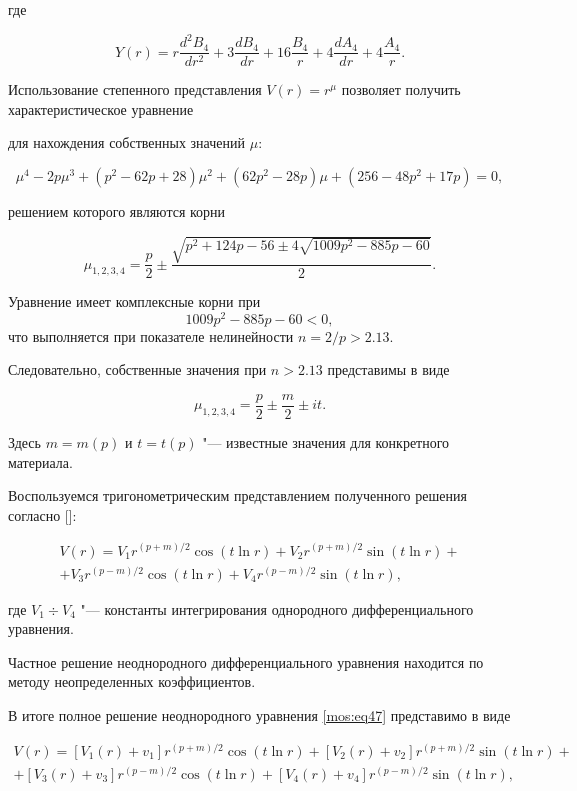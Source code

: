 где

\begin{equation*}

Y(r)=r\frac{d^2B_4}{dr^2}+3\frac{dB_4}{dr}+16\frac{B_4}{r}+4\frac{dA_4}{dr}+4\frac{A_4}{r}.

\end{equation*}



Использование степенного представления $V(r)=r^{\mu}$ позволяет получить характеристическое уравнение

для нахождения собственных значений $\mu$:

$$\mu^4-2p\mu^3+(p^2-62p+28)\mu^2+(62p^2-28p)\mu+(256-48p^2+17p)=0, $$

решением которого являются корни

$$\mu_{1,2,3,4}=\frac p2\pm\frac{\sqrt{p^2+124p-56\pm 4\sqrt{1009 p^2-885p-60}}}{2}.$$

Уравнение имеет комплексные корни при $$1009 p^2-885p-60<0,$$ что выполняется  при показателе нелинейности $n=2/p>2.13$. 

Следовательно, собственные значения  при $n>2.13$ представимы в виде

$$\mu_{1,2,3,4}=\frac p2\pm\frac m2\pm it .$$

Здесь $m=m(p)$  и  $t=t(p)$ "--- известные значения для конкретного материала.

Воспользуемся тригонометрическим представлением полученного решения согласно []:

\begin{multline}

\label{mos:eq48}

V(r)=V_{1} r^{(p+m)/2}\cos(t\ln r)+V_{2} r^{(p+m)/2}\sin(t\ln r)+\\+V_{3} r^{(p-m)/2}\cos(t\ln r)+V_{4} r^{(p-m)/2}\sin(t\ln r),

\end{multline}

где $V_{1}\div V_{4}$  "--- константы интегрирования однородного дифференциального уравнения.



Частное решение неоднородного дифференциального уравнения находится по методу неопределенных коэффициентов.

В итоге полное решение неоднородного уравнения \eqref{mos:eq47} представимо в виде

\begin{multline}

\label{mos:eq49}

V(r)=[V_{1}(r)+v_1] r^{(p+m)/2}\cos(t\ln r)+[V_{2}(r)+v_2] r^{(p+m)/2}\sin(t\ln r)+\\+[V_{3}(r)+v_3] r^{(p-m)/2}\cos(t\ln r)+[V_{4}(r)+v_4] r^{(p-m)/2}\sin(t\ln r),

\end{multline}

